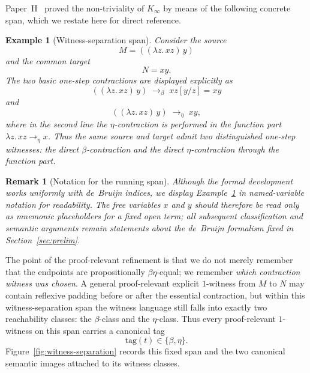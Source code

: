 \documentclass[webpdf,traditional,large,numbered]{oup-authoring-template}
\theoremstyle{thmstyleone}%
\theoremstyle{thmstyletwo}%
\newtheorem{example}[theorem]{Example}
\newtheorem{remark}[theorem]{Remark}
\theoremstyle{thmstylethree}%
\newcommand{\Kinf}{K_\infty}
\begin{document}
Paper~II~\cite{MRdQ:Kinfinity} proved the non-triviality of $\Kinf$ by means of
the following concrete span, which we restate here for direct reference.

\begin{example}[Witness-separation span]\label{ex:witness-span}
Consider the source
\[
  M=((\lambda z.\,xz)\,y)
\]
and the common target
\[
  N=xy.
\]
The two basic one-step contractions are displayed explicitly as
\[
  ((\lambda z.\,xz)\,y)\;\to_\beta\;xz[y/z]=xy
\]
and
\[
  ((\lambda z.\,xz)\,y)\;\to_\eta\;xy,
\]
where in the second line the $\eta$-contraction is performed in the function
part $\lambda z.\,xz\to_\eta x$.  Thus the same source and target admit two
distinguished one-step witnesses: the direct $\beta$-contraction and the direct
$\eta$-contraction through the function part.
\end{example}

\begin{remark}[Notation for the running span]
Although the formal development works uniformly with de~Bruijn indices, we
display Example~\ref{ex:witness-span} in named-variable notation for
readability.  The free variables $x$ and $y$ should therefore be read only as
mnemonic placeholders for a fixed open term; all subsequent classification and
semantic arguments remain statements about the de~Bruijn formalism fixed in
Section~\ref{sec:prelim}.
\end{remark}

The point of the proof-relevant refinement is that we do not merely remember
that the endpoints are propositionally $\beta\eta$-equal; we remember
\emph{which contraction witness was chosen}.  A general proof-relevant explicit
$1$-witness from $M$ to $N$ may contain reflexive padding before or after the
essential contraction, but within this witness-separation span the witness
language still falls into exactly two reachability classes: the $\beta$-class
and the $\eta$-class.  Thus every proof-relevant
$1$-witness on this span carries a canonical tag
\[
  \mathrm{tag}(t)\in\{\beta,\eta\}.
\]
Figure~\ref{fig:witness-separation} records this fixed span and the two
canonical semantic images attached to its witness classes.
\end{document}
